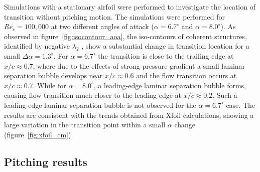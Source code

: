 Simulations with a stationary airfoil were performed to investigate the location of transition without pitching motion. The simulations were performed for $Re_{c}=100,000$ at two different angles of attack ($\alpha=6.7^{\circ}$ and $\alpha=8.0^{\circ}$). As observed in figure~\ref{fig:isocontour_aoa}, the iso-contours of coherent structures, identified by negative $\lambda_{2}$ \citep{jeong95}, show a substantial change in transition location for a small $\Delta\alpha=1.3^{\circ}$. For $\alpha=6.7^{\circ}$ the transition is close to the trailing edge at $x/c\approx0.7$, where due to the effects of strong pressure gradient a small laminar separation bubble develops near $x/c\approx0.6$ and the flow transition occurs at $x/c\approx0.7$. While for $\alpha=8.0^{\circ}$, a leading-edge laminar separation bubble forms, causing flow transition much closer to the leading edge at $x/c\approx0.2$. Such a leading-edge laminar separation bubble is not observed for the $\alpha=6.7^{\circ}$ case. The results are consistent with the trends obtained from Xfoil calculations, showing a large variation in the transition point within a small $\alpha$ change (figure~\ref{fig:xfoil_cm}).
\subsection{Pitching results}

